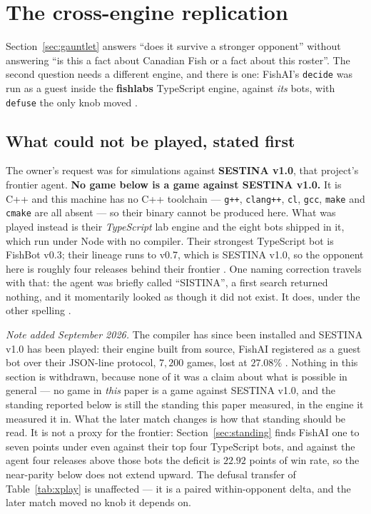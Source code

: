 \documentclass[11pt]{article}
\newcommand{\code}[1]{\texttt{#1}}
\begin{document}
\section{The cross-engine replication}
\label{sec:crossplay}

Section~\ref{sec:gauntlet} answers ``does it survive a stronger opponent'' without answering ``is
this a fact about Canadian Fish or a fact about this roster''. The second question needs a different
engine, and there is one: FishAI's \code{decide} was run as a guest inside the \textbf{fishlabs}
TypeScript engine, against \emph{its} bots, with \code{defuse} the only knob moved \cite{crossplay}.

\subsection{What could not be played, stated first}
\label{sec:sestina}

The owner's request was for simulations against \textbf{SESTINA v1.0}, that project's frontier
agent. \textbf{No game below is a game against SESTINA v1.0.} It is C++ and this machine has no C++
toolchain --- \code{g++}, \code{clang++}, \code{cl}, \code{gcc}, \code{make} and \code{cmake} are
all absent --- so their binary cannot be produced here. What was played instead is their
\emph{TypeScript} lab engine and the eight bots shipped in it, which run under Node with no
compiler. Their strongest TypeScript bot is FishBot v0.3; their lineage runs to v0.7, which is
SESTINA v1.0, so the opponent here is roughly four releases behind their frontier \cite{crossplay}.
One naming correction travels with that: the agent was briefly called ``SISTINA'', a first search
returned nothing, and it momentarily looked as though it did not exist. It does, under the other
spelling \cite{fishlabs}.

\medskip
\noindent\emph{Note added September 2026.} The compiler has since been installed and SESTINA v1.0
has been played: their engine built from source, FishAI registered as a guest bot over their
JSON-line protocol, $7{,}200$ games, lost at $27.08\%$ \cite{frontierpaper}. Nothing in this section
is withdrawn, because none of it was a claim about what is possible in general --- no game in
\emph{this} paper is a game against SESTINA v1.0, and the standing reported below is still the
standing this paper measured, in the engine it measured it in. What the later match changes is how
that standing should be read. It is not a proxy for the frontier: Section~\ref{sec:standing} finds
FishAI one to seven points under even against their top four TypeScript bots, and against the agent
four releases above those bots the deficit is $22.92$ points of win rate, so the near-parity below
does not extend upward. The defusal transfer of Table~\ref{tab:xplay} is unaffected --- it is a
paired within-opponent delta, and the later match moved no knob it depends on.
\end{document}
